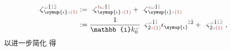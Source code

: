 \begin{subequations}
\begin{align} %
	\Xint{\begin{smallmatrix} ~ \\ {}^{}_{\mathcolor{gray}{-}} \\ ~ \end{smallmatrix}}{12}{\zeta}^{\;\! \mathcolor{gray}{\omega} \hat{1} \mathcolor{gray}{\check{1} \check{2}}}_{\;\! \symup{\iota} \mathcolor{gray}{z} \textcolor{Maroon}{(1)}} &:= \Xint{\begin{smallmatrix} ~ \\ {}^{}_{\mathcolor{gray}{-}} \\ ~ \end{smallmatrix}}{12}{\zeta}^{\;\! \textcolor{Maroon}{\text{b}} \mathcolor{gray}{\omega} \hat{1} \mathcolor{gray}{\check{1}}}_{\;\! \symup{\iota} \mathcolor{gray}{z} \textcolor{Maroon}{(1)}} + \Xint{\begin{smallmatrix} ~ \\ {}^{}_{\mathcolor{gray}{-}} \\ ~ \end{smallmatrix}}{12}{\zeta}^{\;\! \textcolor{Maroon}{\text{e}} \mathcolor{gray}{\omega} \hat{1} \mathcolor{gray}{\check{1}}}_{\;\! \symup{\iota} \mathcolor{gray}{z} \textcolor{Maroon}{(1)}} \label{eq:p<->n} \\ &:= \frac{1}{\mathbb{i} k_0^{\;\! \mathcolor{gray}{\omega}}} \Xint{\begin{smallmatrix} ~ \\ {}^{}_{\mathcolor{gray}{-}} \\ ~ \end{smallmatrix}}{13}{\varsigma}^{\;\! \mathcolor{gray}{\omega} \hat{1} \mathcolor{gray}{\check{1}}}_{\;\! \dot{2} \mathcolor{gray}{z} \textcolor{Maroon}{(1)}} \epsilon^{\hphantom{\symup{\iota}}\mathcolor{gray}{\check{2}}\dot{2}}_{\symup{\iota}} + \Xint{\begin{smallmatrix} ~ \\ {}^{}_{\mathcolor{gray}{-}} \\ ~ \end{smallmatrix}}{13}{\varsigma}^{\;\! \mathcolor{gray}{\omega} \hat{1} \mathcolor{gray}{\check{1}} \mathcolor{gray}{\check{2}}}_{\;\! \dot{2} \mathcolor{gray}{z} \textcolor{Maroon}{(1)}}~,
\end{align}
\end{subequations}
以进一步简化  得
